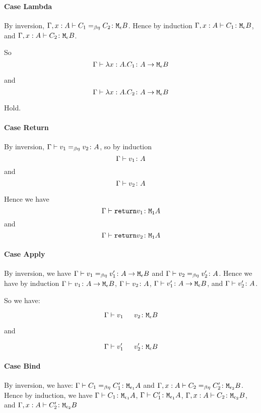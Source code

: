\documentclass{report}
\begin{document}
    \paragraph{Case Lambda}
        By inversion, $\Gamma, x: A \vdash C_1 =_{\beta\eta} C_2 \colon \texttt{M}_{\epsilon}{B}$. Hence by induction $\Gamma, x: A \vdash C_1 \colon \texttt{M}_{\epsilon}{B}$, and $\Gamma, x: A \vdash C_2 \colon \texttt{M}_{\epsilon}{B}$.

        So 
        \begin{equation}
            \Gamma \vdash \lambda x : A. C_1 \colon A \rightarrow \texttt{M}_{\epsilon}{B}
        \end{equation}

        and
        \begin{equation}
            \Gamma \vdash \lambda x : A. C_2 \colon A \rightarrow \texttt{M}_{\epsilon}{B}
        \end{equation}

        Hold.
    \paragraph{Case Return}
        By inversion, $\Gamma \vdash v_1 =_{\beta\eta} v_2 \colon A$, so by induction $$\Gamma \vdash v_1 \colon A$$ and $$\Gamma \vdash v_2 \colon A$$

        Hence we have $$\Gamma \vdash \texttt{return} v_1 \colon \texttt{M}_{\texttt{1}}{A}$$
        and
        $$\Gamma \vdash \texttt{return} v_2 \colon \texttt{M}_{\texttt{1}}{A}$$
    \paragraph{Case Apply}

        By inversion, we have $\Gamma \vdash v_1 =_{\beta\eta} v_1' \colon A \rightarrow \texttt{M}_{\epsilon}{B}$ and $\Gamma \vdash v_2 =_{\beta\eta} v_2' \colon A$. Hence we have by induction $\Gamma \vdash v_1 \colon A \rightarrow \texttt{M}_{\epsilon}{B}$, $\Gamma \vdash v_2 \colon A$, $\Gamma \vdash v_1' \colon A \rightarrow \texttt{M}_{\epsilon}{B}$, and $\Gamma \vdash v_2' \colon A$.

        So we have:

        \begin{equation}
            \gtyperelation{\apply{v_1}{v_2}}{\meb}
        \end{equation}

        and

        
        \begin{equation}
            \gtyperelation{\apply{v_1'}{v_2'}}{\meb}
        \end{equation}

    \paragraph{Case Bind}
        By inversion, we have:
        $\Gamma \vdash C_1 =_{\beta\eta} C_1' \colon \texttt{M}_{\epsilon_1}{A}$ and
        $\Gamma, x: A \vdash C_2 =_{\beta\eta} C_2' \colon \texttt{M}_{\epsilon_2}{B}$.
        Hence by induction, we have 
        $\Gamma \vdash C_1 \colon \texttt{M}_{\epsilon_1}{A}$,
        $\Gamma \vdash C_1' \colon \texttt{M}_{\epsilon_1}{A}$,
        $\Gamma, x: A \vdash C_2 \colon \texttt{M}_{\epsilon_2}{B}$, and 
        $\Gamma, x: A \vdash C_2' \colon \texttt{M}_{\epsilon_2}{B}$
\end{document}
